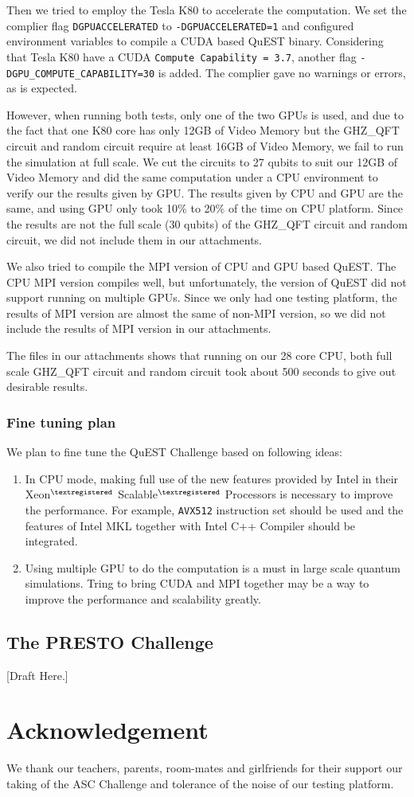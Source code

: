 \documentclass[a4paper, 11pt]{article}
\begin{document}
				Then we tried to employ the Tesla K80 to accelerate the computation. We set the complier flag \texttt{DGPUACCELERATED} to \texttt{-DGPUACCELERATED=1} and configured environment variables to compile a CUDA based QuEST binary. Considering that Tesla K80 have a CUDA \texttt{Compute Capability = 3.7}, another flag \texttt{-DGPU\_COMPUTE\_CAPABILITY=30} is added. The complier gave no warnings or errors, as is expected.
				
				However, when running both tests, only one of the two GPUs is used, and due to the fact that one K80 core has only 12GB of Video Memory but the GHZ\_QFT circuit and random circuit require at least 16GB of Video Memory, we fail to run the simulation at full scale. We cut the circuits to 27 qubits to suit our 12GB of Video Memory and did the same computation under a CPU environment to verify our the results given by GPU. The results given by CPU and GPU are the same, and using GPU only took 10\% to 20\% of the time on CPU platform. Since the results are not the full scale (30 qubits) of the GHZ\_QFT circuit and random circuit, we did not include them in our attachments.
				
				We also tried to compile the MPI version of CPU and GPU based QuEST. The CPU MPI version compiles well, but unfortunately, the  version of QuEST did not support running on multiple GPUs. Since we only had one testing platform, the results of MPI version are almost the same of non-MPI version, so we did not include the results of MPI version in our attachments.
				
				The files in our attachments shows that running on our 28 core CPU, both full scale GHZ\_QFT circuit and random circuit took about 500 seconds to give out desirable results.

			
			\subsubsection{Fine tuning plan}
				
				We plan to fine tune the QuEST Challenge based on following ideas:
				
				\begin{enumerate}
					\item In CPU mode, making full use of the new features provided by Intel in their Xeon$^{\tiny{\textregistered}}$ Scalable$^{\tiny{\textregistered}}$ Processors is necessary to improve the performance. For example, \texttt{AVX512} instruction set should be used and the features of Intel MKL together with Intel C++ Compiler should be integrated.
					\item Using multiple GPU to do the computation is a must in large scale quantum simulations. Tring to bring CUDA and MPI together may be a way to improve the performance and scalability greatly.
				\end{enumerate}

		\subsection{The PRESTO Challenge} [Draft Here.]

	\section*{Acknowledgement} We thank our teachers, parents, room-mates and girlfriends for their support our taking of the ASC Challenge and tolerance of the noise of our testing platform.



\end{document}
